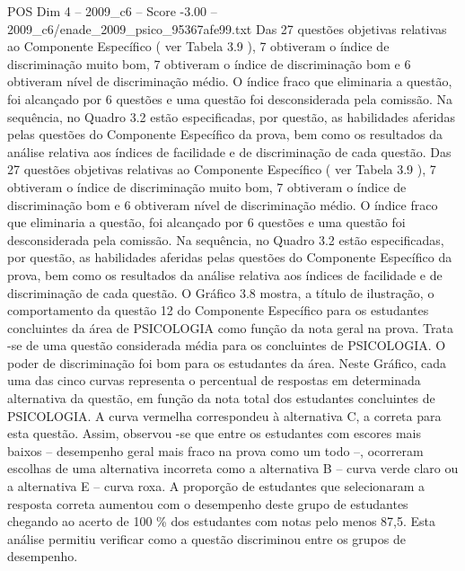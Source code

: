 \begin{textsample}{POS Dim 4 – 2009\_c6 – Score -3.00 – 2009\_c6/enade\_2009\_psico\_95367afe99.txt}
Das 27 questões objetivas relativas ao Componente Específico ( ver Tabela 3.9 ), 7 obtiveram o índice de discriminação muito bom, 7 obtiveram o índice de discriminação bom e 6 obtiveram nível de discriminação médio.
O índice fraco que eliminaria a questão, foi alcançado por 6 questões e uma questão foi desconsiderada pela comissão.
Na sequência, no Quadro 3.2 estão especificadas, por questão, as habilidades aferidas pelas questões do Componente Específico da prova, bem como os resultados da análise relativa aos índices de facilidade e de discriminação de cada questão.
Das 27 questões objetivas relativas ao Componente Específico ( ver Tabela 3.9 ), 7 obtiveram o índice de discriminação muito bom, 7 obtiveram o índice de discriminação bom e 6 obtiveram nível de discriminação médio.
O índice fraco que eliminaria a questão, foi alcançado por 6 questões e uma questão foi desconsiderada pela comissão.
Na sequência, no Quadro 3.2 estão especificadas, por questão, as habilidades aferidas pelas questões do Componente Específico da prova, bem como os resultados da análise relativa aos índices de facilidade e de discriminação de cada questão.
O Gráfico 3.8 mostra, a título de ilustração, o comportamento da questão 12 do Componente Específico para os estudantes concluintes da área de PSICOLOGIA como função da nota geral na prova.
Trata -se de uma questão considerada média para os concluintes de PSICOLOGIA.
O poder de discriminação foi bom para os estudantes da área.
Neste Gráfico, cada uma das cinco curvas representa o percentual de respostas em determinada alternativa da questão, em função da nota total dos estudantes concluintes de PSICOLOGIA.
A curva vermelha correspondeu à alternativa C, a correta para esta questão.
Assim, observou -se que entre os estudantes com escores mais baixos – desempenho geral mais fraco na prova como um todo –, ocorreram escolhas de uma alternativa incorreta como a alternativa B – curva verde claro ou a alternativa E – curva roxa.
A proporção de estudantes que selecionaram a resposta correta aumentou com o desempenho deste grupo de estudantes chegando ao acerto de 100 \% dos estudantes com notas pelo menos 87,5.
Esta análise permitiu verificar como a questão discriminou entre os grupos de desempenho.

\end{textsample}
